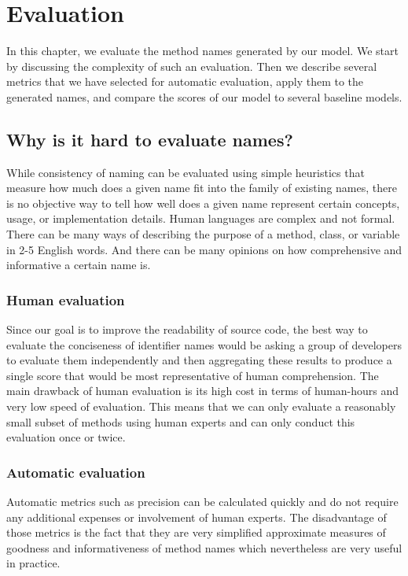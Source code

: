 \chapter{Evaluation}
\label{chap:Evaluation}
\mtoc

In this chapter, we evaluate the method names generated by our model. We start by discussing the complexity of such an evaluation. Then we describe several metrics that we have selected for automatic evaluation, apply them to the generated names, and compare the scores of our model to several baseline models.

\section{Why is it hard to evaluate names?}
\label{sec:Evaluation-WhyHard}

While consistency of naming can be evaluated using simple heuristics that measure how much does a given name fit into the family of existing names, there is no objective way to tell how well does a given name represent certain concepts, usage, or implementation details. Human languages are complex and not formal. There can be many ways of describing the purpose of a method, class, or variable in 2-5 English words. And there can be many opinions on how comprehensive and informative a certain name is.

\subsection{Human evaluation}

Since our goal is to improve the readability of source code, the best way to evaluate the conciseness of identifier names would be asking a group of developers to evaluate them independently and then aggregating these results to produce a single score that would be most representative of human comprehension. The main drawback of human evaluation is its high cost in terms of human-hours and very low speed of evaluation. This means that we can only evaluate a reasonably small subset of methods using human experts and can only conduct this evaluation once or twice.

\subsection{Automatic evaluation}

Automatic metrics such as precision can be calculated quickly and do not require any additional expenses or involvement of human experts. The disadvantage of those metrics is the fact that they are very simplified approximate measures of goodness and informativeness of method names which nevertheless are very useful in practice.

